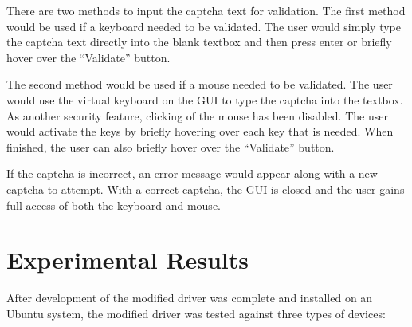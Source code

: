 \documentclass[pagenumbers]{ieee}
\begin{document}
There are two methods to input the captcha text for validation. The first method would be used if a keyboard needed to be validated. The user would simply type the captcha text directly into the blank textbox and then press enter or briefly hover over the ``Validate'' button.

The second method would be used if a mouse needed to be validated. The user would use the virtual keyboard on the GUI to type the captcha into the textbox. As another security feature, clicking of the mouse has been disabled. The user would activate the keys by briefly hovering \cite{hover} over each key that is needed. When finished, the user can also briefly hover over the ``Validate'' button.

If the captcha is incorrect, an error message would appear along with a new captcha to attempt. With a correct captcha, the GUI is closed and the user gains full access of both the keyboard and mouse.


\section{Experimental Results}
\label{section:experimental}

After development of the modified driver was complete and installed on an Ubuntu system, the modified driver was tested against three types of devices: 
\end{document}
